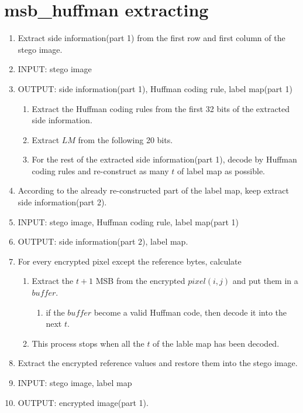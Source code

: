 \documentclass{article}
\begin{document}
\section{msb\_huffman extracting}
\begin{enumerate}
	\item Extract side information(part 1) from the first row and first column of the stego image.
	\item[] INPUT: stego image
	\item[] OUTPUT: side information(part 1), Huffman coding rule, label map(part 1)
	      \begin{enumerate}
		      \item Extract the Huffman coding rules from the first 32 bits of the extracted side information.
		      \item Extract $LM$ from the following 20 bits.
		      \item For the rest of the extracted side information(part 1), decode by Huffman coding rules and re-construct as many $t$ of label map as possible.
	      \end{enumerate}
	      
	\item According to the already re-constructed part of the label map, keep extract side information(part 2).
	\item[] INPUT: stego image, Huffman coding rule, label map(part 1)
	\item[] OUTPUT: side information(part 2), label map.
	\item[] For every encrypted pixel except the reference bytes, calculate
	      \begin{enumerate}
		      \item Extract the $t+1$ MSB from the encrypted $pixel(i, j)$ and put them in a $buffer$.
		            \begin{enumerate}
			            \item if the $buffer$ become a valid Huffman code, then decode it into the next $t$.
		            \end{enumerate}
		      \item This process stops when all the $t$ of the lable map has been decoded.
	      \end{enumerate}
	\item Extract the encrypted reference values and restore them into the stego image.
	\item[] INPUT: stego image, label map
	\item[] OUTPUT: encrypted image(part 1).
	      

\end{enumerate}
\end{document}
